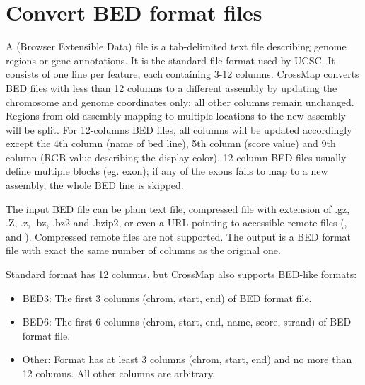 \documentclass[letterpaper,10pt,english]{sphinxmanual}
\begin{document}
\section{Convert BED format files}
\label{\detokenize{index:convert-bed-format-files}}
A  (Browser Extensible Data) file
is a tab-delimited text file describing genome regions or gene annotations. It is the standard
file format used by UCSC. It consists of one line per feature, each containing 3-12 columns.
CrossMap converts BED files with less than 12 columns to a different assembly by updating the
chromosome and genome coordinates only; all other columns remain unchanged. Regions from old
assembly mapping to multiple locations to the new assembly will be split.  For 12-columns BED
files, all columns will be updated accordingly except the 4th column (name of bed line), 5th
column (score value) and 9th column (RGB value describing the display color). 12-column BED
files usually define multiple blocks (eg. exon); if any of the exons fails to map to a new
assembly, the whole BED line is skipped.

The input BED file can be plain text file, compressed file with extension of .gz, .Z, .z,
.bz, .bz2 and .bzip2, or even a URL pointing to accessible remote files (, 
and ). Compressed remote files are not supported. The output is a BED format file with
exact the same number of columns as the original one.

Standard  format has 12 columns, but CrossMap also supports BED-like formats:
\begin{itemize}
\item {} 
BED3: The first 3 columns (\sphinxquotedblleft{}chrom\sphinxquotedblright{}, \sphinxquotedblleft{}start\sphinxquotedblright{}, \sphinxquotedblleft{}end\sphinxquotedblright{}) of BED format file.

\item {} 
BED6: The first 6 columns (\sphinxquotedblleft{}chrom\sphinxquotedblright{}, \sphinxquotedblleft{}start\sphinxquotedblright{}, \sphinxquotedblleft{}end\sphinxquotedblright{}, \sphinxquotedblleft{}name\sphinxquotedblright{}, \sphinxquotedblleft{}score\sphinxquotedblright{}, \sphinxquotedblleft{}strand\sphinxquotedblright{}) of BED format file.

\item {} 
Other: Format has at least 3 columns (\sphinxquotedblleft{}chrom\sphinxquotedblright{}, \sphinxquotedblleft{}start\sphinxquotedblright{}, \sphinxquotedblleft{}end\sphinxquotedblright{}) and no more than 12 columns. All other columns are arbitrary.

\end{itemize}
\end{document}

